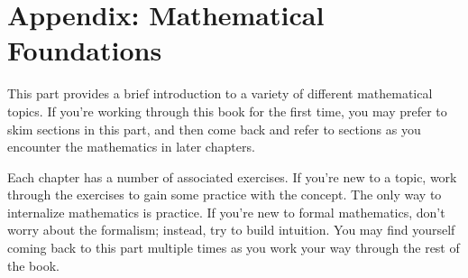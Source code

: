 \documentclass[book.tex]{subfiles}
\begin{document}
\vspace*{36 pt}
\part{Appendix: Mathematical Foundations}
\label{part:math}

This part provides a brief introduction to a variety of different mathematical topics. If you're working through this book for the first time, you may prefer to skim sections in this part, and then come back and refer to sections as you encounter the mathematics in later chapters.

Each chapter has a number of associated exercises. If you're new to a topic, work through the exercises to gain some practice with the concept. The only way to internalize mathematics is practice. If you're new to formal mathematics, don't worry about the formalism; instead, try to build intuition. You may find yourself coming back to this part multiple times as you work your way through the rest of the book.
\newpage

























\end{document}
